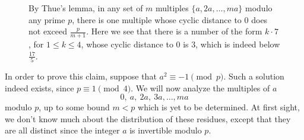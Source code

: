\begin{figure}[t]
  \centering
  \caption[Thue's Lemma]{By Thue's lemma, in any set of $m$ multiples $\{a,2a,\ldots,ma\}$ modulo any prime $p$, there is one multiple whose cyclic distance to $0$ does not exceed $\frac{p}{m+1}$. Here we see that there is a number of the form $k\cdot 7$, for $1\leq k\leq 4$, whose cyclic distance to $0$ is $3$, which is indeed below $\frac{17}{5}$.}
  \label{figure:multiples-of-7}
\end{figure}

In order to prove this claim, suppose that $a^2\equiv -1\pmod{p}$. Such a solution indeed exists, since $p\equiv 1\pmod{4}$. We will now analyze the multiples of $a$
\begin{equation*}
  0,~a,~2a,~3a,\ldots,ma
\end{equation*}
modulo $p$, up to some bound $m<p$ which is yet to be determined. At first sight, we don't know much about the distribution of these residues, except that they are all distinct since the integer $a$ is invertible modulo $p$.

